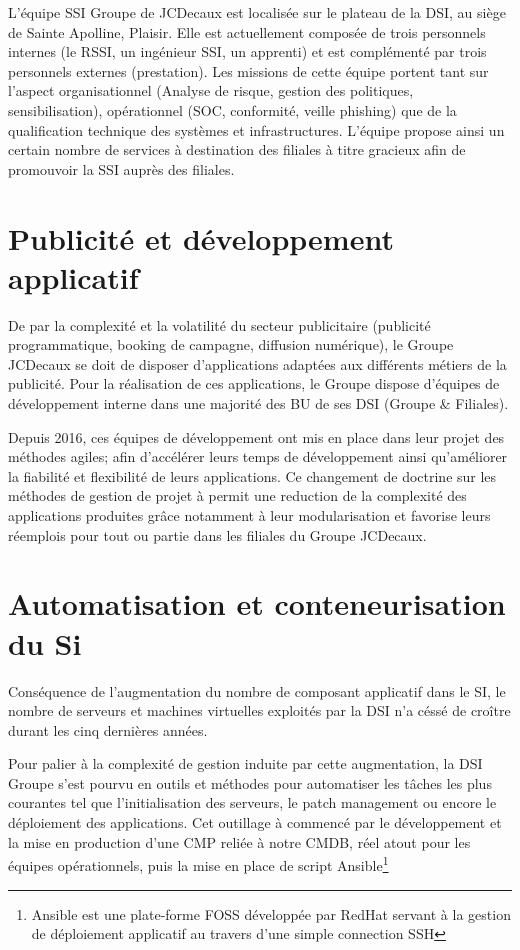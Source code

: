 L'équipe \ac{SSI} Groupe de JCDecaux est localisée sur le plateau de la \ac{DSI}, au siège de Sainte Apolline, Plaisir.
Elle est actuellement composée de trois personnels internes (le \ac{RSSI}, un ingénieur \ac{SSI}, un apprenti) et est complémenté 
par trois personnels externes (prestation).
\newpage
Les missions de cette équipe portent tant sur l'aspect organisationnel (Analyse de risque, gestion des politiques, sensibilisation),
opérationnel (SOC, conformité, veille phishing) que de la qualification technique des systèmes et infrastructures. L'équipe propose
ainsi un certain nombre de services à destination des filiales à titre gracieux afin de promouvoir la \ac{SSI} auprès des filiales.

\section{Publicité et développement applicatif}
De par la complexité et la volatilité du secteur publicitaire (publicité programmatique, booking de campagne, diffusion numérique), 
le Groupe JCDecaux se doit de disposer d'applications adaptées aux différents métiers de la publicité. 
Pour la réalisation de ces applications, le Groupe dispose d'équipes de développement interne dans une majorité des \ac{BU} 
de ses DSI (Groupe \& Filiales).

Depuis 2016, ces équipes de développement  ont mis en place dans leur projet des méthodes agiles; afin 
d'accélérer leurs temps de développement ainsi qu'améliorer la fiabilité et flexibilité de leurs applications.
Ce changement de doctrine sur les méthodes de gestion de projet à permit une reduction de la complexité des applications produites
grâce notamment à leur modularisation et favorise leurs réemplois pour tout ou partie dans les filiales du Groupe JCDecaux.

\section{Automatisation et conteneurisation du Si}
Conséquence de l'augmentation du nombre de composant applicatif dans le SI, le nombre de serveurs et machines virtuelles exploités par 
la \ac{DSI} n'a céssé de croître durant les cinq dernières années.

Pour palier à la complexité de gestion induite par cette augmentation, la \ac{DSI} Groupe s'est pourvu en outils et méthodes pour 
automatiser les tâches les plus courantes tel que l'initialisation des serveurs, le patch management ou encore le déploiement des
applications. Cet outillage à commencé par le développement et la mise en production d'une \ac{CMP} reliée à notre \ac{CMDB}, réel atout 
pour les équipes opérationnels, puis la mise en place de script Ansible\footnote{Ansible est une plate-forme \ac{FOSS} développée par
RedHat servant à la gestion de déploiement applicatif au travers d'une simple connection \ac{SSH}}

